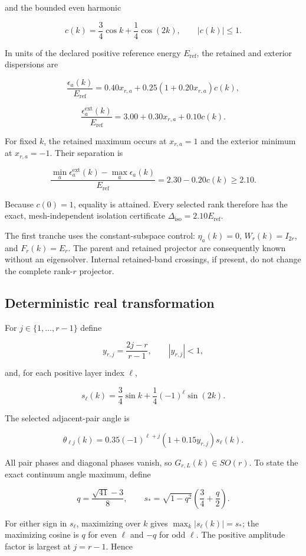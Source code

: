 \documentclass[11pt]{article}
\begin{document}
and the bounded even harmonic

\[
c(k)=\frac34\cos k+\frac14\cos(2k),
\qquad |c(k)|\leq1.
\]

In units of the declared positive reference energy $E_{\mathrm{ref}}$, the retained and
exterior dispersions are

\[
\frac{\epsilon_a(k)}{E_{\mathrm{ref}}}
=0.40x_{r,a}+0.25\left(1+0.20x_{r,a}\right)c(k),
\]

\[
\frac{\epsilon_a^{\mathrm{ext}}(k)}{E_{\mathrm{ref}}}
=3.00+0.30x_{r,a}+0.10c(k).
\]

For fixed $k$, the retained maximum occurs at $x_{r,a}=1$ and the exterior minimum at
$x_{r,a}=-1$. Their separation is

\[
\frac{\min_a\epsilon_a^{\mathrm{ext}}(k)-\max_a\epsilon_a(k)}
{E_{\mathrm{ref}}}
=2.30-0.20c(k)\geq2.10.
\]

Because $c(0)=1$, equality is attained. Every selected rank therefore has the exact,
mesh-independent isolation certificate
$\Delta_{\mathrm{iso}}=2.10E_{\mathrm{ref}}$.

The first tranche uses the constant-subspace control: $\eta_a(k)=0$, $W_r(k)=I_{2r}$, and
$F_r(k)=E_r$. The parent and retained projector are consequently known without an
eigensolver. Internal retained-band crossings, if present, do not change the complete
rank-$r$ projector.

\subsection{Deterministic real transformation}

For $j\in\{1,\ldots,r-1\}$ define

\[
y_{r,j}=\frac{2j-r}{r-1},
\qquad |y_{r,j}|<1,
\]

and, for each positive layer index $\ell$,

\[
s_\ell(k)=\frac34\sin k+\frac14(-1)^\ell\sin(2k).
\]

The selected adjacent-pair angle is

\[
\theta_{\ell j}(k)=0.35(-1)^{\ell+j}
\left(1+0.15y_{r,j}\right)s_\ell(k).
\]

All pair phases and diagonal phases vanish, so
$G_{r,L}(k)\in SO(r)$. To state the exact continuum angle maximum, define

\[
q=\frac{\sqrt{41}-3}{8},
\qquad
s_*=\sqrt{1-q^2}\left(\frac34+\frac q2\right).
\]

For either sign in $s_\ell$, maximizing over $k$ gives $\max_k|s_\ell(k)|=s_*$;
the maximizing cosine is $q$ for even $\ell$ and $-q$ for odd $\ell$. The positive
amplitude factor is largest at $j=r-1$. Hence
\end{document}
